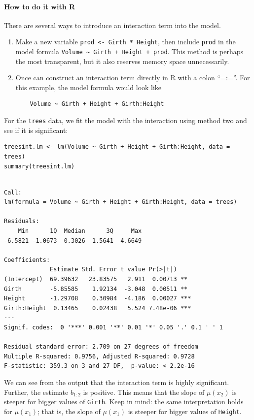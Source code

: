 \documentclass[captions=tableheading]{scrbook}
\begin{document}
\paragraph*{How to do it with \textsf{R}}

There are several ways to introduce an interaction term into the model.
\begin{enumerate}
\item Make a new variable \texttt{prod <- Girth * Height}, then include \texttt{prod} in the model formula \texttt{Volume \textasciitilde{} Girth + Height + prod}. This method is perhaps the most transparent, but it also reserves memory space unnecessarily.
\item Once can construct an interaction term directly in \textsf{R} with a colon ``=:=''. For this example, the model formula would look like 
\begin{verbatim}
    Volume ~ Girth + Height + Girth:Height
\end{verbatim}
\end{enumerate}

For the \texttt{trees} data, we fit the model with the interaction using method two and see if it is significant:


\begin{verbatim}
treesint.lm <- lm(Volume ~ Girth + Height + Girth:Height, data = trees)
summary(treesint.lm)
\end{verbatim}


\begin{verbatim}

Call:
lm(formula = Volume ~ Girth + Height + Girth:Height, data = trees)

Residuals:
    Min      1Q  Median      3Q     Max 
-6.5821 -1.0673  0.3026  1.5641  4.6649 

Coefficients:
             Estimate Std. Error t value Pr(>|t|)    
(Intercept)  69.39632   23.83575   2.911  0.00713 ** 
Girth        -5.85585    1.92134  -3.048  0.00511 ** 
Height       -1.29708    0.30984  -4.186  0.00027 ***
Girth:Height  0.13465    0.02438   5.524 7.48e-06 ***
---
Signif. codes:  0 '***' 0.001 '**' 0.01 '*' 0.05 '.' 0.1 ' ' 1 

Residual standard error: 2.709 on 27 degrees of freedom
Multiple R-squared: 0.9756,	Adjusted R-squared: 0.9728 
F-statistic: 359.3 on 3 and 27 DF,  p-value: < 2.2e-16
\end{verbatim}

We can see from the output that the interaction term is highly significant. Further, the estimate \(b_{1:2}\) is positive. This means that the slope of \(\mu(x_{2})\) is steeper for bigger values of \texttt{Girth}. Keep in mind: the same interpretation holds for \(\mu(x_{1})\); that is, the slope of \(\mu(x_{1})\) is steeper for bigger values of \texttt{Height}.
\end{document}
